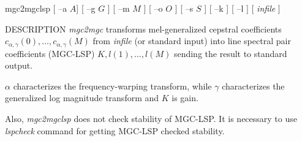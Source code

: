 \begin{synopsis}
\item [mgc2mgclsp] [ --a $A$] [ --g $G$ ] [ --m $M$ ] [ --o $O$ ]
 [ --s $S$ ] [ --k ] [ --l ] [ {\em infile} ]
\end{synopsis}

\begin{qsection}{DESCRIPTION}
{\em mgc2mgc} transforms mel-generalized cepstral coefficients
$c_{\alpha,\gamma}(0), \dots, c_{\alpha,\gamma}(M)$
from {\em infile} (or standard input) 
into line spectral pair coefficients (MGC-LSP) $K, l(1), \dots, l(M)$
sending the result to standard output.

$\alpha$ characterizes the frequency-warping transform,
while $\gamma$ characterizes the generalized log magnitude transform
and $K$ is gain.

Also, {\em mgc2mgclsp} does not
check stability of MGC-LSP. It is necessary to use {\em lspcheck} command
for getting MGC-LSP checked stability.


\end{qsection}

\begin{options}

\end{options}

